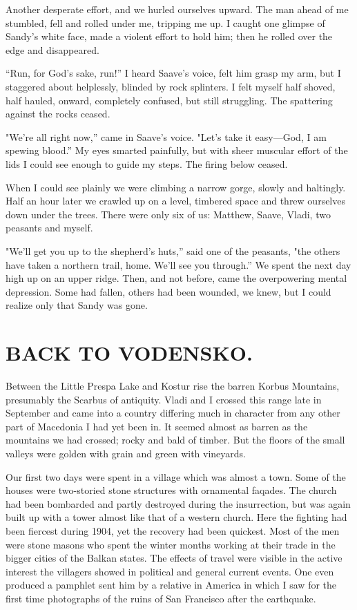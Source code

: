 \documentclass[a5paper,12pt]{book}
\begin{document}
Another desperate effort, and we hurled ourselves upward. The man ahead of me stumbled, fell and rolled under me, tripping me up. I caught one glimpse of Sandy’s white face, made a violent effort to hold him; then he rolled over the edge and disappeared.

“Run, for God’s sake, run!” I heard Saave’s voice, felt him grasp my arm, but I staggered about helplessly, blinded by rock splinters. I felt myself half shoved, half hauled, onward, completely confused, but still struggling. The spattering against the rocks ceased.

"We’re all right now,” came in Saave’s voice. "Let’s take it easy—God, I am spewing blood.” My eyes smarted painfully, but with sheer muscular effort of the lids I could see enough to guide my steps. The firing below ceased.

When I could see plainly we were climbing a narrow gorge, slowly and haltingly. Half an hour later we crawled up on a level, timbered space and threw ourselves down under the trees. There were only six of us: Matthew, Saave, Vladi, two peasants and myself.

"We’ll get you up to the shepherd’s huts,” said one of the peasants, "the others have taken a northern trail, home. We’ll see you through.” We spent the next day high up on an upper ridge. Then, and not before, came the overpowering mental depression. Some had fallen, others had been wounded, we knew, but I could realize only that Sandy was gone.


\chapter{BACK TO VODENSKO.}

Between the Little Prespa Lake and Kostur rise the barren Korbus Mountains, presumably the Scarbus of antiquity. Vladi and I crossed this range late in September and came into a country differing much in character from any other part of Macedonia I had yet been in. It seemed almost as barren as the mountains we had crossed; rocky and bald of timber. But the floors of the small valleys were golden with grain and green with vineyards.

Our first two days were spent in a village which was almost a town. Some of the houses were two-storied stone structures with ornamental faqades. The church had been bombarded and partly destroyed during the insurrection, but was again built up with a tower almost like that of a western church. Here the fighting had been fiercest during 1904, yet the recovery had been quickest. Most of the men were stone masons who spent the winter months working at their trade in the bigger cities of the Balkan states. The effects of travel were visible in the active interest the villagers showed in political and general current events. One even produced a pamphlet sent him by a relative in America in which I saw for the first time photographs of the ruins of San Francisco after the earthquake.
\end{document}
